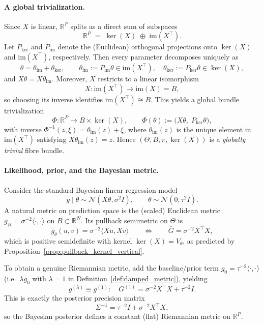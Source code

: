 \paragraph{A global trivialization.}
Since $X$ is linear, $\mathbb R^P$ splits as a direct sum of subspaces
\[
\mathbb R^P \;=\; \ker(X)\;\oplus\;\mathrm{im}(X^\top).
\]
Let $P_{\ker}$ and $P_{\mathrm{im}}$ denote the (Euclidean) orthogonal projections onto
$\ker(X)$ and $\mathrm{im}(X^\top)$, respectively. Then every parameter decomposes uniquely as
\[
\theta = \theta_{\mathrm{im}} + \theta_{\ker},
\qquad
\theta_{\mathrm{im}}:=P_{\mathrm{im}}\theta\in\mathrm{im}(X^\top),
\quad
\theta_{\ker}:=P_{\ker}\theta\in\ker(X),
\]
and $X\theta=X\theta_{\mathrm{im}}$.
Moreover, $X$ restricts to a linear isomorphism
\[
X:\mathrm{im}(X^\top)\longrightarrow \mathrm{im}(X)=B,
\]
so choosing its inverse identifies $\mathrm{im}(X^\top)\cong B$.
This yields a global bundle trivialization
\[
\Phi:\mathbb R^P \longrightarrow B\times \ker(X),
\qquad
\Phi(\theta):=\bigl(X\theta,\;P_{\ker}\theta\bigr),
\]
with inverse $\Phi^{-1}(z,\xi)=\theta_{\mathrm{im}}(z)+\xi$, where $\theta_{\mathrm{im}}(z)$ is the unique
element in $\mathrm{im}(X^\top)$ satisfying $X\theta_{\mathrm{im}}(z)=z$.
Hence $(\Theta,B,\pi,\ker(X))$ is a \emph{globally trivial} fibre bundle.

\paragraph{Likelihood, prior, and the Bayesian metric.}
Consider the standard Bayesian linear regression model
\[
y\mid\theta\sim \mathcal N(X\theta,\sigma^2 I),
\qquad
\theta\sim \mathcal N(0,\tau^2 I).
\]
A natural metric on prediction space is the (scaled) Euclidean metric
$g_B=\sigma^{-2}\langle\cdot,\cdot\rangle$ on $B\subset\mathbb R^N$.
Its pullback semimetric on $\Theta$ is
\[
\bar g_\theta(u,v) = \sigma^{-2}\langle Xu,Xv\rangle
\qquad\Longleftrightarrow\qquad
\bar G = \sigma^{-2}X^\top X,
\]
which is positive semidefinite with kernel $\ker(X)=V_\theta$, as predicted by
Proposition~\ref{prop:pullback_kernel_vertical}.

To obtain a genuine Riemannian metric, add the baseline/prior term
$g_0=\tau^{-2}\langle\cdot,\cdot\rangle$ (i.e.\ $\lambda g_0$ with $\lambda=1$ in
Definition~\ref{def:damped_metric}), yielding
\[
g^{(\lambda)} \equiv g^{(1)}:\quad
G^{(1)} = \sigma^{-2}X^\top X + \tau^{-2}I.
\]
This is exactly the posterior precision matrix
\[
\Sigma^{-1}=\tau^{-2}I+\sigma^{-2}X^\top X,
\]
so the Bayesian posterior defines a constant (flat) Riemannian metric on $\mathbb R^P$.

